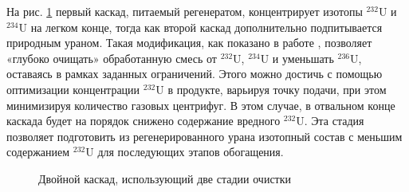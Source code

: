 На рис. \ref{fig:double_palk} первый каскад, питаемый регенератом, концентрирует изотопы $^{232}$U и $^{234}$U на легком конце, тогда как второй каскад дополнительно подпитывается природным ураном.
Такая модификация, как показано в работе , позволяет «глубоко очищать» обработанную смесь от $^{232}$U, $^{234}$U и уменьшать  $^{236}$U, оставаясь в рамках заданных ограничений.
Этого можно достичь с помощью оптимизации концентрации $^{232}$U в продукте, варьируя точку подачи, при этом минимизируя количество газовых центрифуг.
В этом случае, в отвальном конце каскада будет на порядок снижено содержание вредного $^{232}$U.
Эта стадия позволяет подготовить из регенерированного урана изотопный состав с меньшим содержанием $^{232}$U для последующих этапов обогащения.
\begin{figure}[ht]
  \caption{Двойной каскад, использующий две стадии очистки}\label{fig:double_palk}
\end{figure}


